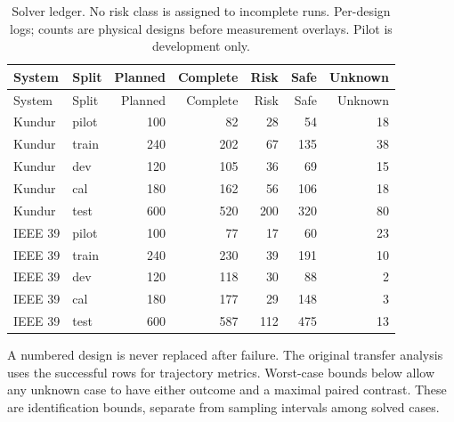 \documentclass[10pt]{article}
\begin{document}
\begingroup\small\setlength{\tabcolsep}{3.8pt}
\begin{longtable}{llrrrrr}
\caption{Solver ledger. No risk class is assigned to incomplete runs. Per-design logs; counts are physical designs before measurement overlays. Pilot is development only.}\\
\toprule System & Split & Planned & Complete & Risk & Safe & Unknown \\\midrule\endfirsthead
\toprule System & Split & Planned & Complete & Risk & Safe & Unknown \\\midrule\endhead
Kundur & pilot & 100 & 82 & 28 & 54 & 18 \\
Kundur & train & 240 & 202 & 67 & 135 & 38 \\
Kundur & dev & 120 & 105 & 36 & 69 & 15 \\
Kundur & cal & 180 & 162 & 56 & 106 & 18 \\
Kundur & test & 600 & 520 & 200 & 320 & 80 \\
IEEE 39 & pilot & 100 & 77 & 17 & 60 & 23 \\
IEEE 39 & train & 240 & 230 & 39 & 191 & 10 \\
IEEE 39 & dev & 120 & 118 & 30 & 88 & 2 \\
IEEE 39 & cal & 180 & 177 & 29 & 148 & 3 \\
IEEE 39 & test & 600 & 587 & 112 & 475 & 13 \\
\bottomrule\end{longtable}\endgroup
A numbered design is never replaced after failure. The original transfer analysis uses the successful rows for trajectory metrics. Worst-case bounds below allow any unknown case to have either outcome and a maximal paired contrast. These are identification bounds, separate from sampling intervals among solved cases.
\end{document}
